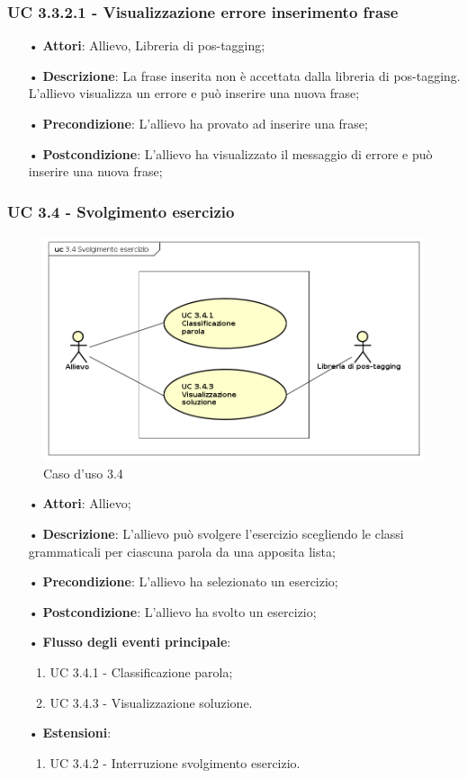 \subsubsection{UC 3.3.2.1 - Visualizzazione errore inserimento frase}
\begin{itemize}
\item[•]\textbf{Attori}: Allievo, Libreria di pos-tagging;
\item[•]\textbf{Descrizione}: La frase inserita non è accettata dalla libreria di pos-tagging. L'allievo visualizza un errore e può inserire una nuova frase;
\item[•]\textbf{Precondizione}: L'allievo ha provato ad inserire una frase;
\item[•]\textbf{Postcondizione}: L'allievo ha visualizzato il messaggio di errore e può inserire una nuova frase;
\end{itemize}

\subsubsection{UC 3.4 - Svolgimento esercizio}
\begin{figure}[H]
\centering
\includegraphics[width=17cm]{img/UC34.png} 
\caption{Caso d'uso 3.4}\label{fig:34}
\end{figure}
\begin{itemize}
\item[•]\textbf{Attori}: Allievo;
\item[•]\textbf{Descrizione}: L'allievo può svolgere l'esercizio scegliendo le classi grammaticali per ciascuna parola da una apposita lista;
\item[•]\textbf{Precondizione}: L'allievo ha selezionato un esercizio;
\item[•]\textbf{Postcondizione}: L'allievo ha svolto un esercizio;
\item[•]\textbf{Flusso degli eventi principale}:
\begin{enumerate}
\item UC 3.4.1 - Classificazione parola;
\item UC 3.4.3 - Visualizzazione soluzione.
\end{enumerate}
\item[•]\textbf{Estensioni}:
\begin{enumerate}
\item UC 3.4.2 - Interruzione svolgimento esercizio.
\end{enumerate}
\end{itemize}


